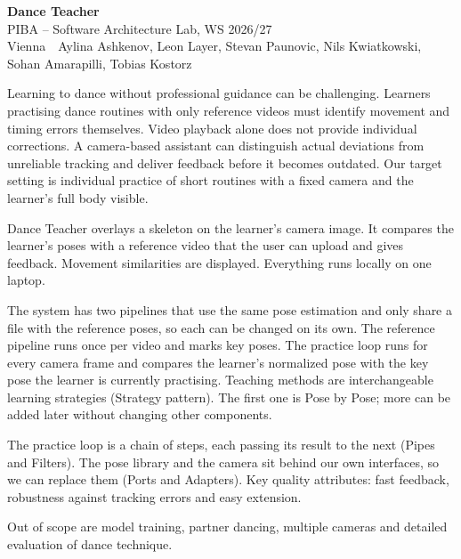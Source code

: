 \documentclass[11pt,a4paper]{article}
\newcommand{\pibapart}[1]{\vspace{0.4em}{\large\textbf{#1}}\par}
\newcommand{\projecttitle}{Dance Teacher}
\newcommand{\teamname}{Vienna}
\newcommand{\teammembers}{Aylina Ashkenov, Leon Layer, Stevan Paunovic, Nils Kwiatkowski, Sohan Amarapilli, Tobias Kostorz}
\begin{document}
\begin{center}
  {\LARGE\textbf{\projecttitle}}\\[0.4em]
  {\large PIBA -- Software Architecture Lab, WS 2026/27}\\[0.3em]
  \teamname\ \textbullet\ \teammembers
\end{center}

\pibapart{Problem}
Learning to dance without professional guidance can be challenging. Learners
practising dance routines with only reference videos must identify movement and
timing errors themselves. Video playback alone does not provide individual
corrections. A camera-based assistant can distinguish actual deviations from
unreliable tracking and deliver feedback before it becomes outdated. Our target
setting is individual practice of short routines with a fixed camera and the
learner's full body visible.

\pibapart{Idea}
Dance Teacher overlays a skeleton on the learner's camera image. It compares
the learner's poses with a reference video that the user can upload and gives
feedback. Movement similarities are displayed. Everything runs locally on one
laptop.

The system has two pipelines that use the same pose estimation and only share a
file with the reference poses, so each can be changed on its own. The reference
pipeline runs once per video and marks key poses. The practice loop runs for
every camera frame and compares the learner's normalized pose with the key pose
the learner is currently practising. Teaching methods are interchangeable
learning strategies (Strategy pattern). The first one is Pose by Pose; more can
be added later without changing other components.

The practice loop is a chain of steps, each passing its result to the next
(Pipes and Filters). The pose library and the camera sit behind our own
interfaces, so we can replace them (Ports and Adapters). Key quality
attributes: fast feedback, robustness against tracking errors and easy
extension.

Out of scope are model training, partner dancing, multiple cameras and detailed
evaluation of dance technique.
\end{document}
